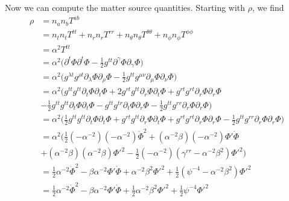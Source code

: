 \documentclass[12pt]{article}
\numberwithin{equation}{section}
\begin{document}
Now we can compute the matter source quantities.  Starting with $\rho$, we find
\begin{equation}
\begin{aligned}
\rho &= n_a n_b T^{ab} \\
&= n_t n_t T^{tt} + n_r n_r T^{rr} + n_\theta n_\theta T^{\theta \theta} + n_\phi n_\phi T^{\phi \phi} \\
&= \alpha^{2} T^{tt} \\
&= \alpha^{2} \Big( \partial^t \Phi \partial^t \Phi - \frac{1}{2} g^{t t} \partial^\gamma \Phi \partial_\gamma \Phi \Big) \\
&= \alpha^{2} \Big( g^{\lambda t} g^{\rho t} \partial_\lambda \Phi \partial_\rho \Phi - \frac{1}{2} g^{t t} g^{\mu \nu} \partial_{\mu} \Phi \partial_{\nu} \Phi \Big) \\
&= \alpha^{2} \Big( g^{t t} g^{t t} \partial_t \Phi \partial_t \Phi + 2 g^{r t} g^{t t} \partial_r \Phi \partial_t \Phi + g^{r t} g^{r t} \partial_r \Phi \partial_r \Phi \\
&- \frac{1}{2} g^{t t} g^{t t} \partial_{t} \Phi \partial_{t} \Phi - g^{t t} g^{t r} \partial_{t} \Phi \partial_{r} \Phi - \frac{1}{2} g^{t t} g^{r r} \partial_{r} \Phi \partial_{r} \Phi \Big) \\
&= \alpha^{2} \Big( \frac{1}{2} g^{t t} g^{t t} \partial_t \Phi \partial_t \Phi + g^{r t} g^{t t} \partial_r \Phi \partial_t \Phi + g^{r t} g^{r t} \partial_r \Phi \partial_r \Phi - \frac{1}{2} g^{t t} g^{r r} \partial_{r} \Phi \partial_{r} \Phi \Big) \\
&= \alpha^{2} \Big( \frac{1}{2} (-\alpha^{-2}) (-\alpha^{-2}) \dot{\Phi}^2 + (\alpha^{-2} \beta) (-\alpha^{-2}) \Phi' \dot{\Phi} \\
&+ (\alpha^{-2} \beta) (\alpha^{-2} \beta) \Phi'^2 - \frac{1}{2} (-\alpha^{-2}) (\gamma^{rr} - \alpha^{-2} \beta^2) \Phi'^2 \Big) \\
&= \frac{1}{2} \alpha^{-2} \dot{\Phi}^2 - \beta \alpha^{-2} \Phi' \dot{\Phi} + \alpha^{-2} \beta^2 \Phi'^2 + \frac{1}{2} (\psi^{-4} - \alpha^{-2} \beta^2) \Phi'^2 \\
&= \frac{1}{2} \alpha^{-2} \dot{\Phi}^2 - \beta \alpha^{-2} \Phi' \dot{\Phi} + \frac{1}{2} \alpha^{-2} \beta^2 \Phi'^2 + \frac{1}{2} \psi^{-4} \Phi'^2 \\
\end{aligned}
\end{equation}
\end{document}
